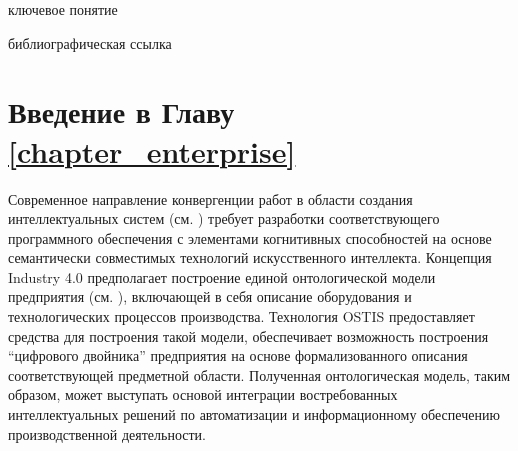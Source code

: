 \begin{SCn}
\bigskip
\begin{scnrelfromlist}{ключевое понятие}
\end{scnrelfromlist}

\bigskip

\begin{scnrelfromlist}{библиографическая ссылка}
    
\end{scnrelfromlist}

\end{SCn}


\section*{Введение в Главу \ref{chapter_enterprise}}

Современное направление конвергенции работ в области создания интеллектуальных систем (см. ) требует разработки соответствующего программного обеспечения с элементами когнитивных способностей на основе семантически совместимых технологий искусственного интеллекта. Концепция Industry 4.0 предполагает построение единой онтологической модели предприятия (см. ), включающей в себя описание оборудования и технологических процессов производства. Технология OSTIS предоставляет средства для построения такой модели, обеспечивает возможность построения ``цифрового двойника'' предприятия на основе формализованного описания соответствующей предметной области. Полученная онтологическая модель, таким образом, может выступать основой интеграции востребованных интеллектуальных решений по автоматизации и информационному обеспечению производственной деятельности.

